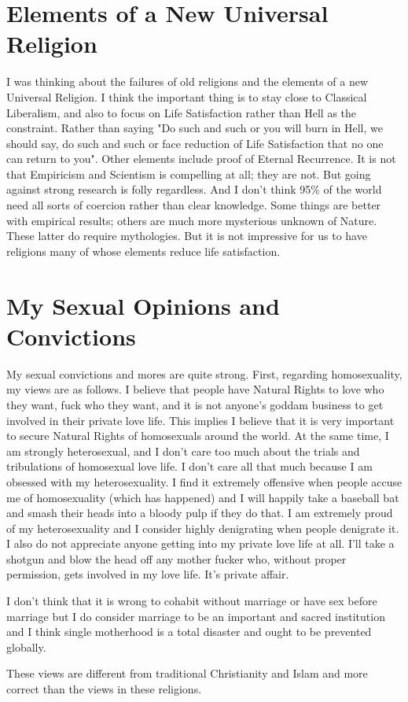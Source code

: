 \documentclass{amsart}
\begin{document}
\section{Elements of a New Universal Religion}

I was thinking about the failures of old religions and the elements of a new Universal Religion.  I think the important thing is to stay close to Classical Liberalism, and also to focus on Life Satisfaction rather than Hell as the constraint.  Rather than saying "Do such and such or you will burn in Hell, we should say, do such and such or face reduction of Life Satisfaction that no one can return to you".  Other elements include proof of Eternal Recurrence.  It is not that Empiricism and Scientism is compelling at all; they are not.  But going against strong research is folly regardless.  And I don't think 95\% of the world need all sorts of coercion rather than clear knowledge.  Some things are better with empirical results; others are much more mysterious unknown of Nature.  These latter do require mythologies. But it is not impressive for us to have religions many of whose elements reduce life satisfaction.

\section{My Sexual Opinions and Convictions}

My sexual convictions and mores are quite strong.  First, regarding homosexuality, my views are as follows.  I believe that people have Natural Rights to love who they want, fuck who they want, and it is not anyone's goddam business to get involved in their private love life.  This implies I believe that it is very important to secure Natural Rights of homosexuals around the world.  At the same time, I am strongly heterosexual, and I don't care too much about the trials and tribulations of homosexual love life.  I don't care all that much because I am obsessed with my heterosexuality.  I find it extremely offensive when people accuse me of homosexuality (which has happened) and I will happily take a baseball bat and smash their heads into a bloody pulp if they do that.  I am extremely proud of my heterosexuality and I consider highly denigrating when people denigrate it.  I also do not appreciate anyone getting into my private love life at all.  I'll take a shotgun and blow the head off any mother fucker who, without proper permission, gets involved in my love life.  It's private affair. 

I don't think that it is wrong to cohabit without marriage or have sex before marriage but I do consider marriage to be an important and sacred institution and I think single motherhood is a total disaster and ought to be prevented globally.

These views are different from traditional Christianity and Islam and more correct than the views in these religions.
\end{document}
